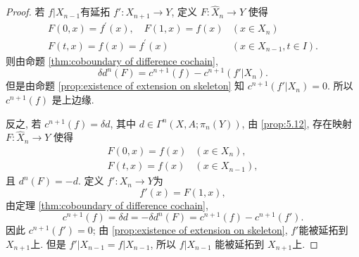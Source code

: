 \documentclass{ctexart}
\theoremstyle{plain}
\theoremstyle{definition}
\begin{document}
            \begin{proof}
                若 $f|X_{n-1}$有延拓 $f':X_{n+1}\to Y$, 定义 $F:\hat{X}_{n}\to Y$ 使得
                \begin{equation*}
                    \begin{array}{ll}
                        F(0, x)=f^{\prime}(x), \quad F(1, x)=f(x) & \left(x \in X_n\right) \\
                        F(t, x)=f(x)=f^{\prime}(x) & \left(x \in X_{n-1}, t \in I\right) .
                    \end{array}
                \end{equation*}
                则由命题 \ref{thm:coboundary of difference cochain},
                \begin{equation*}
                  \delta d^{n}(F)=c^{n+1}(f)-c^{n+1}(f'|X_{n}).
                \end{equation*}
                但是由命题 \ref{prop:existence of extension on skeleton} 知 $c^{n+1}(f'|X_{n})=0$. 所以 $c^{n+1}(f)$ 是上边缘.

                反之, 若 $c^{n+1}(f)=\delta d$, 其中 $d \in \Gamma^{n}(X,A;\pi_{n}(Y))$, 由 \ref{prop:5.12}, 存在映射 $F:\hat{X}_{n}\to Y$ 使得 
                \begin{equation*}
                    \begin{array}{ll}
                        F(0, x)=f(x) & \left(x \in X_n\right), \\
                        F(t, x)=f(x) & \left(x \in X_{n-1}\right),
                    \end{array}
                \end{equation*}
                且 $d^{n}(F)=-d$. 定义 $f':X_{n}\to Y$为 
                \begin{equation*}
                  f'(x)=F(1,x),
                \end{equation*}
                由定理 \ref{thm:coboundary of difference cochain}, 
                \begin{equation*}
                  c^{n+1}(f)=\delta d=-\delta d^{n}(F)=c^{n+1}(f)-c^{n+1}(f').
                \end{equation*}
                因此 $c^{n+1}(f')=0$; 由 \ref{prop:existence of extension on skeleton}, $f'$能被延拓到 $X_{n+1}$上. 但是 $f'|X_{n-1}=f|X_{n-1}$, 所以 $f|X_{n-1}$ 能被延拓到 $X_{n+1}$上.
            \end{proof}
\end{document}
